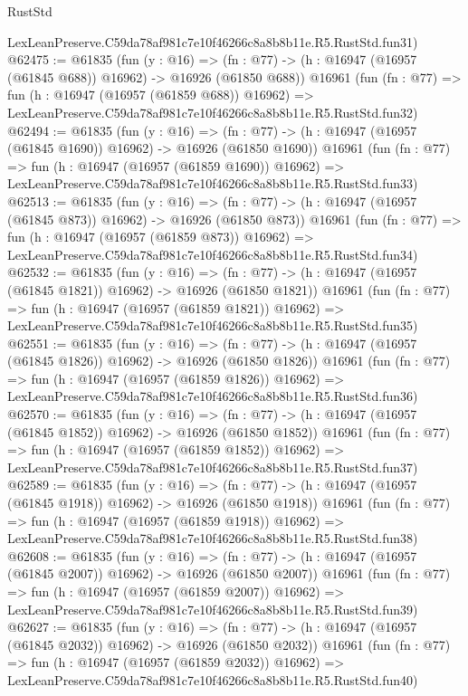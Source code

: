 \begin{lexlean}{RustStd}
\begin{coremodule}
    LexLeanPreserve.C59da78af981c7e10f46266c8a8b8b11e.R5.RustStd.fun31)
@62475 := @61835
    (fun (y : @16) =>
    (fn : @77) -> (h : @16947 (@16957 (@61845 @688)) @16962) -> @16926 (@61850 @688))
    @16961
    (fun (fn : @77) =>
    fun (h : @16947 (@16957 (@61859 @688)) @16962) =>
    LexLeanPreserve.C59da78af981c7e10f46266c8a8b8b11e.R5.RustStd.fun32)
@62494 := @61835
    (fun (y : @16) =>
    (fn : @77) -> (h : @16947 (@16957 (@61845 @1690)) @16962) -> @16926 (@61850 @1690))
    @16961
    (fun (fn : @77) =>
    fun (h : @16947 (@16957 (@61859 @1690)) @16962) =>
    LexLeanPreserve.C59da78af981c7e10f46266c8a8b8b11e.R5.RustStd.fun33)
@62513 := @61835
    (fun (y : @16) =>
    (fn : @77) -> (h : @16947 (@16957 (@61845 @873)) @16962) -> @16926 (@61850 @873))
    @16961
    (fun (fn : @77) =>
    fun (h : @16947 (@16957 (@61859 @873)) @16962) =>
    LexLeanPreserve.C59da78af981c7e10f46266c8a8b8b11e.R5.RustStd.fun34)
@62532 := @61835
    (fun (y : @16) =>
    (fn : @77) -> (h : @16947 (@16957 (@61845 @1821)) @16962) -> @16926 (@61850 @1821))
    @16961
    (fun (fn : @77) =>
    fun (h : @16947 (@16957 (@61859 @1821)) @16962) =>
    LexLeanPreserve.C59da78af981c7e10f46266c8a8b8b11e.R5.RustStd.fun35)
@62551 := @61835
    (fun (y : @16) =>
    (fn : @77) -> (h : @16947 (@16957 (@61845 @1826)) @16962) -> @16926 (@61850 @1826))
    @16961
    (fun (fn : @77) =>
    fun (h : @16947 (@16957 (@61859 @1826)) @16962) =>
    LexLeanPreserve.C59da78af981c7e10f46266c8a8b8b11e.R5.RustStd.fun36)
@62570 := @61835
    (fun (y : @16) =>
    (fn : @77) -> (h : @16947 (@16957 (@61845 @1852)) @16962) -> @16926 (@61850 @1852))
    @16961
    (fun (fn : @77) =>
    fun (h : @16947 (@16957 (@61859 @1852)) @16962) =>
    LexLeanPreserve.C59da78af981c7e10f46266c8a8b8b11e.R5.RustStd.fun37)
@62589 := @61835
    (fun (y : @16) =>
    (fn : @77) -> (h : @16947 (@16957 (@61845 @1918)) @16962) -> @16926 (@61850 @1918))
    @16961
    (fun (fn : @77) =>
    fun (h : @16947 (@16957 (@61859 @1918)) @16962) =>
    LexLeanPreserve.C59da78af981c7e10f46266c8a8b8b11e.R5.RustStd.fun38)
@62608 := @61835
    (fun (y : @16) =>
    (fn : @77) -> (h : @16947 (@16957 (@61845 @2007)) @16962) -> @16926 (@61850 @2007))
    @16961
    (fun (fn : @77) =>
    fun (h : @16947 (@16957 (@61859 @2007)) @16962) =>
    LexLeanPreserve.C59da78af981c7e10f46266c8a8b8b11e.R5.RustStd.fun39)
@62627 := @61835
    (fun (y : @16) =>
    (fn : @77) -> (h : @16947 (@16957 (@61845 @2032)) @16962) -> @16926 (@61850 @2032))
    @16961
    (fun (fn : @77) =>
    fun (h : @16947 (@16957 (@61859 @2032)) @16962) =>
    LexLeanPreserve.C59da78af981c7e10f46266c8a8b8b11e.R5.RustStd.fun40)

\end{coremodule}
\end{lexlean}
